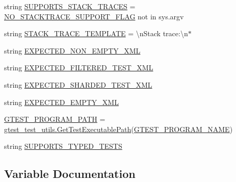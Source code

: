 \begin{DoxyCompactItemize}
\item 
string \mbox{\hyperlink{namespacegtest__xml__output__unittest_a44c65b6262eb7d1a0f561dafb0819e47}{S\+U\+P\+P\+O\+R\+T\+S\+\_\+\+S\+T\+A\+C\+K\+\_\+\+T\+R\+A\+C\+ES}} = \mbox{\hyperlink{namespacegtest__xml__output__unittest_a1e97a1796a1c452a4ab5fc2f8d422914}{N\+O\+\_\+\+S\+T\+A\+C\+K\+T\+R\+A\+C\+E\+\_\+\+S\+U\+P\+P\+O\+R\+T\+\_\+\+F\+L\+AG}} not in sys.\+argv
\item 
string \mbox{\hyperlink{namespacegtest__xml__output__unittest_abd57c1a4124b74d2ba63d03734df491d}{S\+T\+A\+C\+K\+\_\+\+T\+R\+A\+C\+E\+\_\+\+T\+E\+M\+P\+L\+A\+TE}} = \textquotesingle{}\textbackslash{}n\+Stack trace\+:\textbackslash{}n$\ast$\textquotesingle{}
\item 
string \mbox{\hyperlink{namespacegtest__xml__output__unittest_ab6a01b4b81a702e476f53b1b3c4983c0}{E\+X\+P\+E\+C\+T\+E\+D\+\_\+\+N\+O\+N\+\_\+\+E\+M\+P\+T\+Y\+\_\+\+X\+ML}}
\item 
string \mbox{\hyperlink{namespacegtest__xml__output__unittest_a1adb060422f833cb8b99403d13144399}{E\+X\+P\+E\+C\+T\+E\+D\+\_\+\+F\+I\+L\+T\+E\+R\+E\+D\+\_\+\+T\+E\+S\+T\+\_\+\+X\+ML}}
\item 
string \mbox{\hyperlink{namespacegtest__xml__output__unittest_a6414d0bcac5f56ef1b709e312b976b1e}{E\+X\+P\+E\+C\+T\+E\+D\+\_\+\+S\+H\+A\+R\+D\+E\+D\+\_\+\+T\+E\+S\+T\+\_\+\+X\+ML}}
\item 
string \mbox{\hyperlink{namespacegtest__xml__output__unittest_abe1569d019b037f006986004349c7cf3}{E\+X\+P\+E\+C\+T\+E\+D\+\_\+\+E\+M\+P\+T\+Y\+\_\+\+X\+ML}}
\item 
\mbox{\hyperlink{namespacegtest__xml__output__unittest_a8c4cf6e9b6a184278a1b2759e5eaec6b}{G\+T\+E\+S\+T\+\_\+\+P\+R\+O\+G\+R\+A\+M\+\_\+\+P\+A\+TH}} = \mbox{\hyperlink{namespacegtest__test__utils_a89ed3717984a80ffbb7a9c92f71b86a2}{gtest\+\_\+test\+\_\+utils.\+Get\+Test\+Executable\+Path}}(\mbox{\hyperlink{namespacegtest__xml__output__unittest_ab89cc5b402310ef67bcaf38fa5017461}{G\+T\+E\+S\+T\+\_\+\+P\+R\+O\+G\+R\+A\+M\+\_\+\+N\+A\+ME}})
\item 
string \mbox{\hyperlink{namespacegtest__xml__output__unittest_a07eecd027d660022c0ab447f3c3e0f2e}{S\+U\+P\+P\+O\+R\+T\+S\+\_\+\+T\+Y\+P\+E\+D\+\_\+\+T\+E\+S\+TS}}
\end{DoxyCompactItemize}


\subsection{Variable Documentation}
\mbox{\label{namespacegtest__xml__output__unittest_abe1569d019b037f006986004349c7cf3}} 
